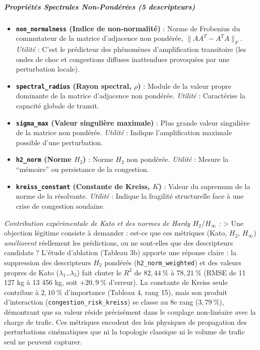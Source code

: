 \documentclass[10pt, a4paper]{article}
\providecommand{\tightlist}{}
\begin{document}
\subparagraph{Propriétés Spectrales Non-Pondérées (5
descripteurs)}\label{propriuxe9tuxe9s-spectrales-non-ponduxe9ruxe9es-5-descripteurs-1}

\begin{itemize}
\tightlist
\item
  \textbf{\texttt{non\_normalness} (Indice de non-normalité)} : Norme de
  Frobenius du commutateur de la matrice d'adjacence non pondérée,
  \(\|AA^T - A^TA\|_F\). \emph{Utilité} : C'est le prédicteur des
  phénomènes d'amplification transitoire (les ondes de choc et
  congestions diffuses inattendues provoquées par une perturbation
  locale).
\item
  \textbf{\texttt{spectral\_radius} (Rayon spectral, \(\rho\))} : Module
  de la valeur propre dominante de la matrice d'adjacence non pondérée.
  \emph{Utilité} : Caractérise la capacité globale de transit.
\item
  \textbf{\texttt{sigma\_max} (Valeur singulière maximale)} : Plus
  grande valeur singulière de la matrice non pondérée. \emph{Utilité} :
  Indique l'amplification maximale possible d'une perturbation.
\item
  \textbf{\texttt{h2\_norm} (Norme \(H_2\))} : Norme \(H_2\) non
  pondérée. \emph{Utilité} : Mesure la ``mémoire'' ou persistance de la
  congestion.
\item
  \textbf{\texttt{kreiss\_constant} (Constante de Kreiss, \(K\))} :
  Valeur du supremum de la norme de la résolvante. \emph{Utilité} :
  Indique la fragilité structurelle face à une crise de congestion
  soudaine.
\end{itemize}

\emph{Contribution expérimentale de Kato et des normes de Hardy
\(H_2/H_\infty\) :} \textgreater{} Une objection légitime consiste à
demander : est-ce que ces métriques (Kato, \(H_2\), \(H_\infty\))
\emph{améliorent} réellement les prédictions, ou ne sont-elles que des
descripteurs candidats ? L'étude d'ablation (Tableau 3b) apporte une
réponse claire : la suppression des descripteurs \(H_2\) pondérés
(\texttt{h2\_norm\_weighted}) et des valeurs propres de Kato
(\(\lambda_1..\lambda_5\)) fait chuter le \(R^2\) de \(82{,}44\ \%\) à
\(78{,}21\ \%\) (RMSE de 11 127 kg à 13 456 kg, soit \(+20{,}9\ \%\)
d'erreur). La constante de Kreiss seule contribue à \(2{,}10\ \%\)
d'importance (Tableau 4, rang 15), mais son produit d'interaction
(\texttt{congestion\_risk\_kreiss}) se classe au 8e rang
(\(3{,}79\ \%\)), démontrant que sa valeur réside précisément dans le
couplage non-linéaire avec la charge de trafic. Ces métriques encodent
des lois physiques de propagation des perturbations cinématiques que ni
la topologie classique ni le volume de trafic seul ne peuvent capturer.
\end{document}

